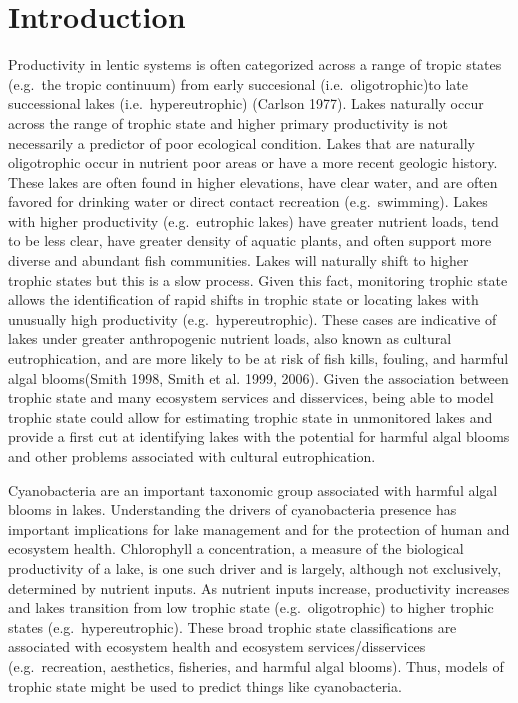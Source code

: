 \documentclass[11pt,]{article}
\begin{document}
\begin{singlespace}
\begin{abstract}
\end{abstract}
\end{singlespace}

\section{Introduction}\label{introduction}

Productivity in lentic systems is often categorized across a range of
tropic states (e.g.~the tropic continuum) from early succesional
(i.e.~oligotrophic)to late successional lakes (i.e.~hypereutrophic)
(Carlson 1977). Lakes naturally occur across the range of trophic state
and higher primary productivity is not necessarily a predictor of poor
ecological condition. Lakes that are naturally oligotrophic occur in
nutrient poor areas or have a more recent geologic history. These lakes
are often found in higher elevations, have clear water, and are often
favored for drinking water or direct contact recreation (e.g.~swimming).
Lakes with higher productivity (e.g.~eutrophic lakes) have greater
nutrient loads, tend to be less clear, have greater density of aquatic
plants, and often support more diverse and abundant fish communities.
Lakes will naturally shift to higher trophic states but this is a slow
process. Given this fact, monitoring trophic state allows the
identification of rapid shifts in trophic state or locating lakes with
unusually high productivity (e.g.~hypereutrophic). These cases are
indicative of lakes under greater anthropogenic nutrient loads, also
known as cultural eutrophication, and are more likely to be at risk of
fish kills, fouling, and harmful algal blooms(Smith 1998, Smith et al.
1999, 2006). Given the association between trophic state and many
ecosystem services and disservices, being able to model trophic state
could allow for estimating trophic state in unmonitored lakes and
provide a first cut at identifying lakes with the potential for harmful
algal blooms and other problems associated with cultural eutrophication.

Cyanobacteria are an important taxonomic group associated with harmful
algal blooms in lakes. Understanding the drivers of cyanobacteria
presence has important implications for lake management and for the
protection of human and ecosystem health. Chlorophyll a concentration, a
measure of the biological productivity of a lake, is one such driver and
is largely, although not exclusively, determined by nutrient inputs. As
nutrient inputs increase, productivity increases and lakes transition
from low trophic state (e.g.~oligotrophic) to higher trophic states
(e.g.~hypereutrophic). These broad trophic state classifications are
associated with ecosystem health and ecosystem services/disservices
(e.g.~recreation, aesthetics, fisheries, and harmful algal blooms).
Thus, models of trophic state might be used to predict things like
cyanobacteria.
\end{document}
